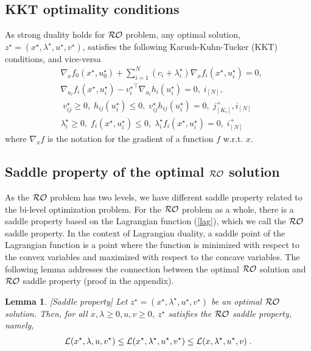 \documentclass[journal,twoside,web]{ieeecolor}
\newtheorem{lemma}{Lemma}
\begin{document}
\subsection{KKT optimality conditions}
As strong duality holds for ${\cal RO}$ problem, any optimal solution, $z^\star=(x^\star,\lambda^\star,u^\star,v^\star)$, satisfies the following Karush-Kuhn-Tucker (KKT) conditions, and vice-versa \cite{boyd2004}
\begin{align}
&\nabla_x f_0(x^\star,u_0^\star)+  \sum_{i=1}^N(c_i+\lambda^\star_i) \nabla_x f_i(x^\star,u_i^\star)=0,\label{kkt1}\\
&\nabla_{u_i} f_i(x^\star,u_i^\star)-{v_i^\star}^\top \nabla_{u_i} h_i(u_i^\star)=0,\; i_ {[N]},\label{kkt2}\\
&\;v_{ij}^\star\geq 0,\; h_{ij}(u_i^\star)\leq 0,\;v_{ij}^\star h_{ij}(u_i^\star)=0,\;  j^+_{[K_i]}, i_{[N]} \label{kkt3}\\
&\lambda_i^\star\geq 0,\;f_{i}(x^\star,u_i^\star)\leq 0,\;\lambda_i^\star f_{i}(x^\star,u_i^\star)=0,\;i^+_{[N]} \label{kkt4}
\end{align}
where $\nabla_x f$ is the notation for the gradient of a function $f$ w.r.t. $x$.

\subsection{Saddle property of the optimal ${\cal RO}$ solution}
As the ${\cal RO}$ problem has two levels, we have different saddle property related to the bi-level optimization problem. For the ${\cal RO}$ problem as a whole, there is a saddle property based on the Lagrangian function (\ref{lag}), which we call the ${\cal RO}$ saddle property. In the context of Lagrangian duality, a saddle point of the Lagrangian function is a point where the function is minimized with respect to the convex variables and maximized with respect to the concave variables. The following lemma addresses the connection between the optimal ${\cal RO}$ solution and ${\cal RO}$ saddle property (proof in the appendix).

\begin{lemma} \label{saddle.lem} [Saddle property]
Let $z^\star=(x^\star,\lambda^\star,u^\star,v^\star)$ be an optimal ${\cal RO}$ solution. Then, for all $x,\lambda\geq 0,u,v\geq 0$\;, $z^\star$ satisfies the ${\cal RO}$ saddle property, namely,
\begin{align} \label{saddle}
{\cal L}(x^\star,\lambda,u,v^\star)\leq {\cal L}(x^\star,\lambda^\star,u^\star,v^\star)\leq {\cal L}(x,\lambda^\star,u^\star,v)\;.
\end{align}
\end{lemma}
\end{document}
